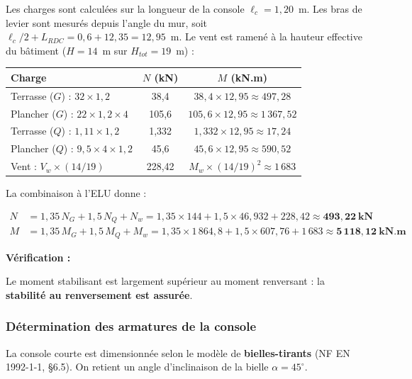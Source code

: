 Les charges sont calculées sur la longueur de la console $\ell_c = 1{,}20$~m. Les bras de levier sont mesurés depuis l'angle du mur, soit $\ell_c/2 + L_{RDC} = 0{,}6 + 12{,}35 = 12{,}95$~m. Le vent est ramené à la hauteur effective du bâtiment ($H = 14$~m sur $H_{tot} = 19$~m) :

\begin{center}
\begin{tabularx}{0.95\linewidth}{Xcc}
\toprule
\textbf{Charge} & \textbf{$N$ (kN)} & \textbf{$M$ (kN.m)} \\
\midrule
Terrasse ($G$) : $32 \times 1{,}2$              & 38{,}4    & $38{,}4 \times 12{,}95 \approx 497{,}28$ \\
Plancher ($G$) : $22 \times 1{,}2 \times 4$     & 105{,}6   & $105{,}6 \times 12{,}95 \approx 1\,367{,}52$ \\
Terrasse ($Q$) : $1{,}11 \times 1{,}2$          & 1{,}332   & $1{,}332 \times 12{,}95 \approx 17{,}24$ \\
Plancher ($Q$) : $9{,}5 \times 4 \times 1{,}2$  & 45{,}6    & $45{,}6 \times 12{,}95 \approx 590{,}52$ \\
Vent : $V_w \times (14/19)$                     & 228{,}42  & $M_w \times (14/19)^2 \approx 1\,683$ \\
\bottomrule
\end{tabularx}
\end{center}

La combinaison à l'ELU donne :

\[
\begin{aligned}
N &= 1{,}35 \, N_G + 1{,}5 \, N_Q + N_w = 1{,}35 \times 144 + 1{,}5 \times 46{,}932 + 228{,}42 \approx \mathbf{493{,}22~\text{kN}}\\
M &= 1{,}35 \, M_G + 1{,}5 \, M_Q + M_w = 1{,}35 \times 1\,864{,}8 + 1{,}5 \times 607{,}76 + 1\,683 \approx \mathbf{5\,118{,}12~\text{kN.m}}
\end{aligned}
\]

\textbf{Vérification :}

Le moment stabilisant est largement supérieur au moment renversant : la \textbf{stabilité au renversement est assurée}.

\subsubsection{Détermination des armatures de la console}

La console courte est dimensionnée selon le modèle de \textbf{bielles-tirants} (NF EN 1992-1-1, §6.5). On retient un angle d'inclinaison de la bielle $\alpha = 45^\circ$.

